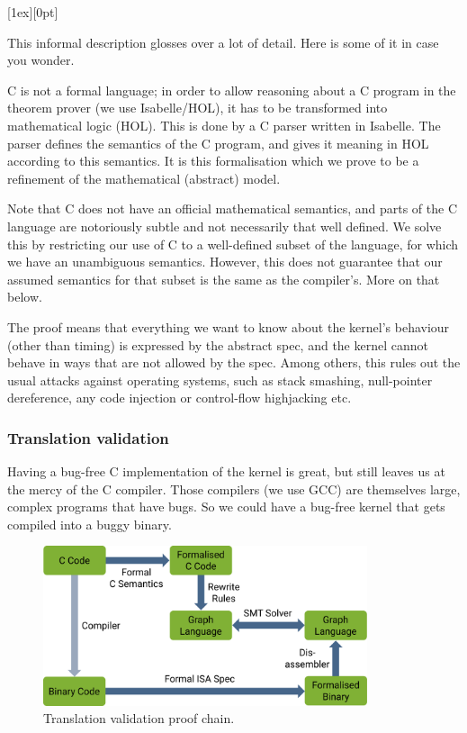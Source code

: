 \documentclass[english,a4paper,12pt\ifDraft,draft\fi]{report}
\newcommand{\SSSect}[1]{\subsubsection*{#1}}
\newcommand{\SSSect}[1]{\subsection*{#1}}
\newlength{\chillilng}\setlength{\chillilng}{8mm}
\newlength{\chillimarg}\setlength{\chillimarg}{10mm}
\newcommand{\chilli}{\texttt{[image: chilli]}}
\newcommand{\chilliItem}{\raisebox{-5mm}[1ex][0pt]{%
      \makebox[\chillilng][r]{\chilli}}}
\newenvironment{Chilli}{
    \begin{list}{}{
      \setlength{\labelwidth}{\chillilng}
      \setlength{\leftmargin}{\chillimarg}}
    \item[\chilliItem]
    }
  {\end{list}}
\begin{document}
  \begin{Chilli}
    This informal description glosses over a lot of detail. Here is some
    of it in case you wonder.

    C is not a formal language; in order to allow reasoning about a C
    program in the theorem prover (we use Isabelle/HOL), it has to be
    transformed into mathematical logic (HOL). This is done by a C
    parser written in Isabelle. The parser defines the semantics of
    the C program, and gives it meaning in HOL according to this semantics.
    It is this formalisation
    which we prove to be a refinement of the mathematical (abstract) model.

    Note that C does not have an official mathematical semantics, and
    parts of the C language are notoriously subtle and not necessarily
    that well defined. We solve this by restricting our use of C to a
    well-defined subset of the language, for which we have an
    unambiguous semantics. However, this does not guarantee that our
    assumed semantics for that subset is the same as the
    compiler's. More on that below.
  \end{Chilli}

  The  proof means that everything we want to
  know about the kernel's behaviour (other than timing) is expressed
  by the abstract spec, and the kernel cannot behave in ways that are
  not allowed by the spec. Among others, this rules out the usual
  attacks against operating systems, such as stack smashing,
  null-pointer dereference, any code injection or control-flow highjacking etc.

  \SSSect{Translation validation}

  Having a bug-free C implementation of the kernel is great, but still
  leaves us at the mercy of the C compiler. Those compilers (we use
  GCC) are themselves large, complex programs that have
  bugs. So we could have a bug-free kernel that gets compiled into a
  buggy binary.

  \begin{figure}[th]
    \centering
    \includegraphics[width=0.85\textwidth]{binary}
    \caption{Translation validation proof chain.}
    \label{f:binary}
  \end{figure}
\end{document}
